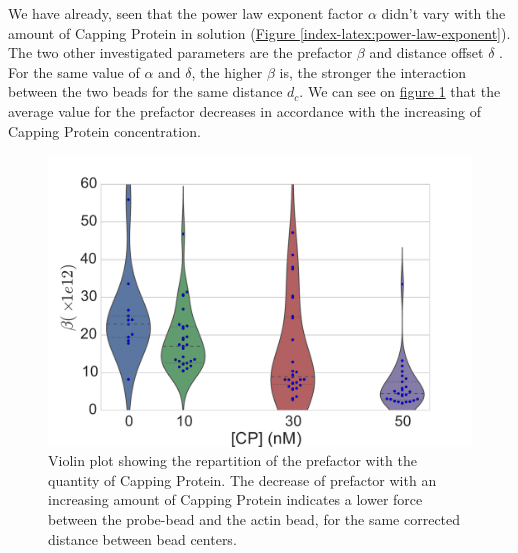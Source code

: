 \documentclass[A4paperpaper,11pt,english]{sphinxmanual}
\begin{document}
We have already,  seen  that the power law exponent factor \(\alpha\)
didn't vary with the amount of Capping Protein in solution (\hyperref[index-latex:power-law-exponent]{Figure  \ref*{index-latex:power-law-exponent}}).
The two other investigated parameters are the prefactor
\(\beta\) and distance offset \(\delta\) . For the same value of \(\alpha\) and \(\delta\), the
higher \(\beta\) is, the stronger the interaction between the two beads for
the same distance \(d_c\). We can see on \hyperref[index-latex:beta-violin]{figure  \ref*{index-latex:beta-violin}} that the
average value for the prefactor decreases in accordance with the increasing of Capping Protein
concentration.
\begin{figure}[htbp]
\centering
\capstart

\includegraphics[width=0.800\linewidth]{beta_violin.pdf}
\caption{Violin plot showing the repartition of the prefactor with the quantity of
Capping Protein. The decrease of prefactor with an increasing amount of Capping
Protein indicates a lower force between the probe-bead and the actin bead,
for the same corrected distance between bead centers.}\label{index-latex:beta-violin}\end{figure}
\end{document}
